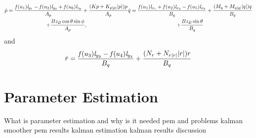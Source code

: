 \documentclass[11pt]{beamer}
\begin{document}
\begin{frame}[shrink]
\begin{subequations} \label{eq:pq_dot_decouple}
\begin{multline} \label{eq:pq_dot_decouple1}
\pdot = \frac{\thrusterfun{1} \distance{y}{1} - \thrusterfun{2} \distance{y}{2} + \thrusterfun{6} \distance{z}{6}}{A_p} + \frac{(Kp + \Kpabsp \abs{p})p}{A_p} \\ + \frac{B z_B \cos{\theta} \sin{\phi}}{A_p},
\end{multline}  
\begin{multline} \label{eq:pq_dot_decouple2}
\qdot =\frac{\thrusterfun{1} \distance{x}{1} + \thrusterfun{2} \distance{x}{2} - \thrusterfun{5} \distance{x}{5}}{B_q} + \frac{(\Mq + \Mqabsq \abs{q})q}{B_q} \\ + \frac{B z_B \sin{\theta}}{B_q} 
\end{multline}  
\end{subequations} and
\begin{equation} \label{eq:r_dot_decouple}
\dot{r} = \frac{\mathit{f}(u_{3}) \mathit{l}_{y_{3}} - \mathit{f}(u_{4}) \mathit{l}_{y_{4}}}{B_q} + \frac{(N_{r} + N_{r|r|} |r|)r}{B_q}
\end{equation}
\end{frame}

\section{Parameter Estimation}
\begin{frame}
What is parameter estimation and why is it needed
pem and problems
kalman smoother
pem results
kalman estimation
kalman results
discussion
\end{frame}

\end{document}
